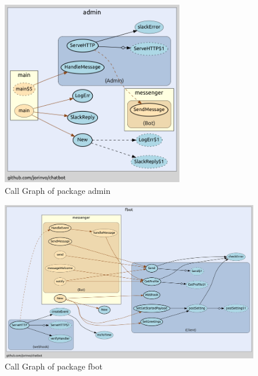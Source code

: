 \begin{figure}[h]
  \centering
  \includegraphics[height=8cm]{images/call-graph-admin.png}
	\caption{Call Graph of package admin}
\end{figure}

\begin{figure}[h]
  \centering
  \includegraphics[width=\textwidth]{images/call-graph-fbot.png}
	\caption{Call Graph of package fbot}
\end{figure}
